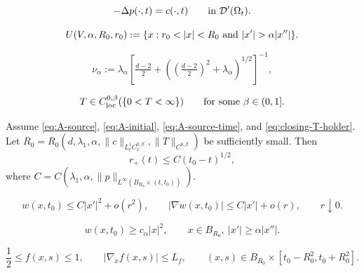 \documentclass[10pt,a4paper]{amsart}
\begin{document}
\begin{equation}\label{eq:HS-pointwise-pressure-equation}
    -\Delta p(\cdot,t)=c(\cdot,t)
    \qquad\hbox{in }\mathcal D'(\Omega_t).
\end{equation}

\begin{equation}\label{eq:u_alpha}
    U(V,\alpha,R_0,r_0) := \{ x : r_0 < |x| < R_0 \hbox{ and } |x'| > \alpha |x''| \}.
\end{equation}

\begin{equation}\label{eq:cone_exponent}
    \nu_\alpha := \lambda_\alpha[\tfrac{d-2}{2} + ((\tfrac{d-2}{2})^2 + \lambda_\alpha)^{1/2}]^{-1},
\end{equation}

\begin{equation}\label{eq:closing-T-holder}
    T\in C^{0,\beta}_{\operatorname{loc}}(\{0<T<\infty\})
    \qquad\hbox{for some }\beta\in(0,1] .
\end{equation}

\begin{lem}\label{lem:r_plus_upper_bd}
Assume \eqref{eq:A-source}, \eqref{eq:A-initial}, \eqref{eq:A-source-time}, and
\eqref{eq:closing-T-holder}. Let $R_0=R_0(d,\lambda_1, \alpha,\|c\|_{L^1_t C^{0,\beta}_x}, \|T\|_{C^{0,\beta}})$ be sufficiently small. Then
\begin{equation}\label{eq:upper_bd_r}
    r_+(t) \leq C(t_0 - t)^{1/2},
\end{equation}
where $C = C(\lambda_1, \alpha, \|p\|_{L^\infty(B_{R_0}\times (t,t_0))})$.
\end{lem}

\begin{equation}\label{eq:cone_w0_bounds}
    w(x,t_0)\leq C|x'|^2+o(r^2),
    \qquad
    |\nabla w(x,t_0)|\leq C|x'|+o(r),
    \qquad r\downarrow0.
\end{equation}

\begin{equation}\label{eq:cone_Ur_positive_at_t0}
    w(x,t_0)\geq c_\alpha |x|^2,
    \qquad x\in B_{R_0},\ |x'|\geq \alpha |x''|.
\end{equation}

\begin{equation}\label{eq:cone_f_slice}
    \frac12\leq f(x,s)\leq 1,
    \qquad
    |\nabla_x f(x,s)|\leq L_f,
    \qquad
    (x,s)\in B_{R_0}\times [t_0-R_0^2,t_0+R_0^2].
\end{equation}
\end{document}
